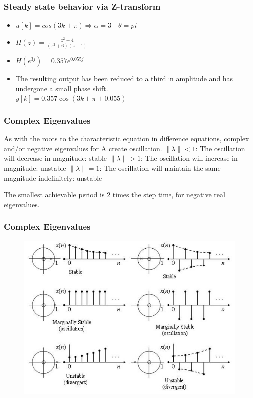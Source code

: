 \begin{frame}
	\frametitle{Steady state behavior via Z-transform}
	\begin{example}
		\begin{itemize}
			\item $u[k] = cos(3k+\pi) \Rightarrow \alpha = 3 \quad \theta = pi$
			\item $H(z) = \frac{z^2+4}{(z^2+6)(z-1)}$
			\item $H(e^{3j}) = 0.357e^{0.055j}$
			\item The resulting output has been reduced to a third in amplitude and has undergone a small phase shift. \\
			$ y[k] =0.357 \cos(3k+\pi + 0.055)$
			
		\end{itemize}
	\end{example}
\end{frame}
\begin{frame}
	\frametitle{Complex Eigenvalues }
	As with the roots to the characteristic equation in difference equations, complex and/or negative eigenvalues for A create oscillation.
	$\lVert\lambda\rVert < 1$: The oscillation will decrease in magnitude: stable
	$\lVert\lambda\rVert > 1$: The oscillation will increase in magnitude:  unstable
	$\lVert\lambda\rVert = 1$: The oscillation will maintain the same magnitude indefinitely:  unstable
	
	The smallest achievable period is 2 times the step time, for negative real eigenvalues.
	
\end{frame}
\begin{frame}
		\frametitle{Complex Eigenvalues }
		\begin{figure}
			\centering
			\includegraphics[width=0.7\linewidth]{Images/discrete_time_systems_33}
		\end{figure}
\end{frame}
